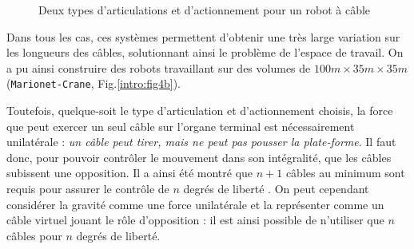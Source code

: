 \begin{figure}[!ht]
  \centering
\hfill
    \caption{\footnotesize Deux types d'articulations et d'actionnement pour un 
robot à câble}
\label{intro:fig4}
\end{figure}

Dans tous les cas, ces systèmes permettent d'obtenir une très large variation 
sur les longueurs des câbles, solutionnant ainsi le problème de l'espace de 
travail. On a pu ainsi construire des robots travaillant sur des volumes de
$100m\times35m\times35m$ ({\tt Marionet-Crane}, \cite{merlet2010} 
Fig.\ref{intro:fig4b}).

Toutefois, quelque-soit le type d'articulation et d'actionnement choisis, la 
force que peut exercer un seul câble sur l'organe terminal est nécessairement 
unilatérale : {\em un câble peut tirer, mais ne peut pas pousser la 
plate-forme}. Il faut donc, pour pouvoir contrôler le mouvement dans son 
intégralité, que les câbles subissent une opposition. Il a ainsi été montré que 
$n+1$ câbles au minimum sont requis pour assurer le contrôle de $n$ degrés de 
liberté \cite{1994:Ming.Higuchi}. On peut cependant considérer la gravité comme 
une force unilatérale et la représenter comme un câble virtuel jouant le rôle 
d'opposition : il est ainsi possible de n'utiliser que $n$ câbles pour $n$ 
degrés de liberté.


